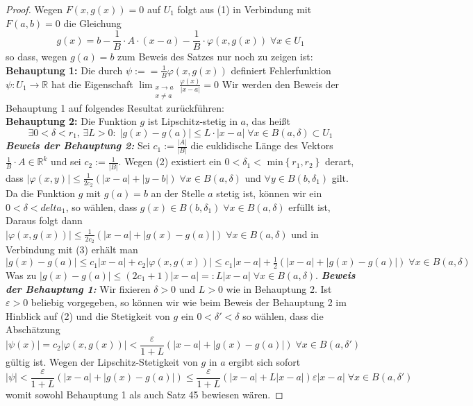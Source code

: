 \begin{proof}
Wegen $ F (x, g (x) ) = 0 $ auf $ U_1 $  folgt aus (1) in Verbindung mit $ F (a,b) = 0 $ die Gleichung  
\begin{equation}
g (x) = b - \frac{1}{B} \cdot A \cdot (x-a) - \frac{1}{B} \cdot \varphi( x,g (x) ) \; \forall x \in U_1	
	\tag{3}
\end{equation}
so dass, wegen $ g (a) = b $ zum Beweis des Satzes nur noch zu zeigen ist:\\
\textbf{Behauptung 1: }
Die durch $ \psi := = \frac{1}{B} \varphi \left( x, g (x)  \right)  $ definiert Fehlerfunktion $ \psi : U_1 \to \mathbb{R}  $ hat die 
Eigenschaft $ \lim_{ \substack{ x \to a \\ x \neq a } }\frac{\varphi (x) }{|x-a|} = 0   $ 
Wir werden den Beweis der Behauptung 1 auf folgendes Resultat zurückführen:\\
\textbf{Behauptung 2:} Die Funktion $ g $ ist Lipschitz-stetig in $ a $, das heißt
$$
\exists 0 < \delta < r_1, \, \exists L > 0 : \; 
| g (x)  - g (a)| \leq L \cdot | x - a | \; \forall x \in B(a,\delta) \subset U_1
$$
\textit{\textbf{Beweis der Behauptung 2:} } Sei $ c_1 := \frac{|A|}{|B|}  $ die euklidische Länge des Vektors  $ \frac{1}{B} \cdot A 
\in \mathbb{R}^k$ und sei $ c_2 := \frac{1}{|B|}  $. Wegen (2) existiert ein $ 0 < \delta_1 < \text{ min} \left\{ r_1,r_2 \right\}   $ 
derart, dass $ | \varphi (x,y)| \leq  \frac{1}{2 c_2}  \left( |x-a| + |y-b| \right) \; \forall x \in  B(a, \delta) $ und 
$ \forall y \in  B(b,\delta_1) $ gilt. Da die Funktion $ g $ mit $ g (a) = b  $ an der Stelle $ a $ stetig ist, können wir ein 
$ 0< \delta < delta_1 $, so wählen, dass $ g (x)  \in B(b, \delta_1) \; \forall x \in B (a,\delta) $ erfüllt ist, Daraus folgt dann
$ |\varphi(x, g (x) ) | \leq  \frac{1}{2 c_2}  \left( |x-a| + |g(x) - g (a) | \right) \; \forall x \in B (a,\delta) $ und in 
Verbindung mit (3) erhält man $ |g (x) - g (a) | \leq  c_1 |x-a|+ c_2 |\varphi \left( x, g (x)  \right)| \leq 
c_1 |x-a| + \frac{1}{2} \left( |x-a| + |g (x) - g (a) | \right) \; \forall x \in  B (a, \delta) $  
Was zu $ |g (x) - g (a) | \leq (2c_1 + 1) |x - a| =: L |x-a| \; \forall x \in  B (a, \delta ) $.
\textit{\textbf{Beweis der Behauptung 1:} } Wir fixieren $ \delta > 0 \text{ und }  L > 0  $ wie in Behauptung 2. Ist $ \varepsilon > 0$ 
beliebig vorgegeben, so können wir wie beim Beweis der Behauptung 2 im Hinblick auf (2) und die Stetigkeit von $ g $ ein 
$ 0 < \delta' < \delta $ so wählen, dass die Abschätzung 
$$ | \psi (x) | = c_2 \left| \varphi \left( x, g(x)\right) \right| < \frac{\varepsilon }{1 + L} \left( |x-a| + |g (x) - g (a)|\right)
 \; \forall x \in B \left( a, \delta' \right)  $$
gültig ist. Wegen der Lipschitz-Stetigkeit von $ g $ in $ a $ ergibt sich sofort 
$$ | \psi|<  \frac{\varepsilon }{1 + L} \left( |x-a| + |g (x) - g (a)|\right) \leq  \frac{\varepsilon }{1 + L} 
\left( |x-a| + L|x-a|\right) \varepsilon |x-a| \; \forall x \in B (a, \delta') $$
womit sowohl Behauptung 1 als auch Satz 45 bewiesen wären.
\end{proof}
